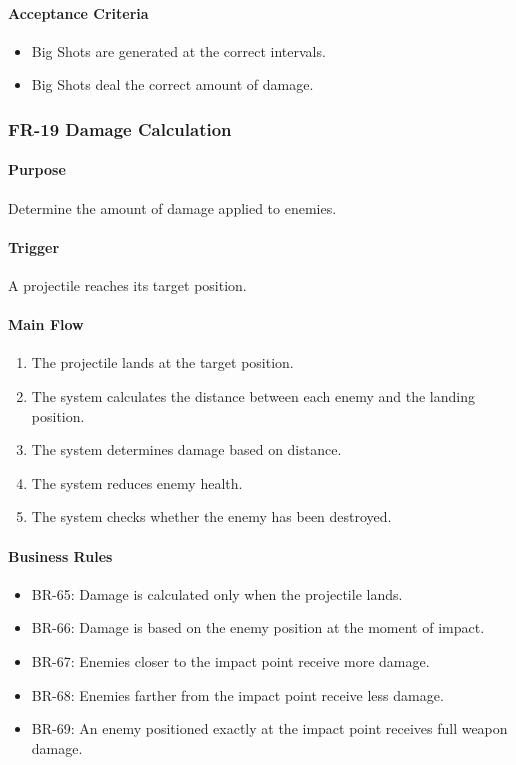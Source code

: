 \documentclass[11pt,a4paper]{article}
\begin{document}
\paragraph{Acceptance Criteria}
\begin{itemize}
  \item Big Shots are generated at the correct intervals.
  \item Big Shots deal the correct amount of damage.
\end{itemize}

\subsubsection{FR-19 Damage Calculation}

\paragraph{Purpose}
Determine the amount of damage applied to enemies.

\paragraph{Trigger}
A projectile reaches its target position.

\paragraph{Main Flow}
\begin{enumerate}
  \item The projectile lands at the target position.
  \item The system calculates the distance between each enemy and the landing
        position.
  \item The system determines damage based on distance.
  \item The system reduces enemy health.
  \item The system checks whether the enemy has been destroyed.
\end{enumerate}

\paragraph{Business Rules}
\begin{itemize}
  \item BR-65: Damage is calculated only when the projectile lands.
  \item BR-66: Damage is based on the enemy position at the moment of impact.
  \item BR-67: Enemies closer to the impact point receive more damage.
  \item BR-68: Enemies farther from the impact point receive less damage.
  \item BR-69: An enemy positioned exactly at the impact point receives full
        weapon damage.
\end{itemize}
\end{document}

